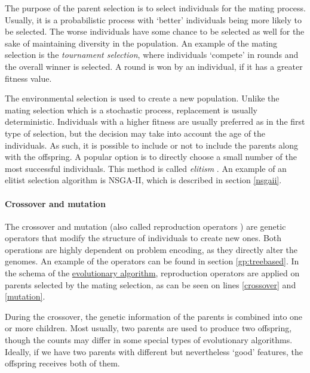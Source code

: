 The purpose of the parent selection is to select individuals for the
mating process. Usually, it is a probabilistic process with `better'
individuals being more likely to be selected. The worse individuals have some
chance to be selected as well for the sake of maintaining diversity in the
population. An example of the mating selection is the
\emph{tournament selection}, where individuals `compete' in rounds and the
overall winner is selected. A round is won by an individual, if it has a 
greater fitness value.

The environmental selection is used to create a new 
population. Unlike the mating selection which is a stochastic process,
replacement is usually deterministic. Individuals with a higher fitness are
usually preferred as in the first type of selection, but the decision may take 
into account the age of the individuals. As such, it is possible to include 
or not to include the parents along with the offspring. A popular option is to 
directly choose a small number of the most successful individuals. This method 
is called \emph{elitism} \citep{Eiben:2015:IEC:2810085}.
An example of an elitist selection algorithm is NSGA-II, which
is described in section \ref{nsgaii}.

\paragraph{Crossover and mutation}
The crossover and mutation (also called reproduction operators
\citep{Engelbrecht:2007:CII:1557464}) are genetic operators that modify the
structure of individuals to create new ones. Both operations are highly
dependent on problem encoding, as they directly alter the genomes. An example
of the operators can be found in section \ref{gp:treebased}. In the schema 
of the \hyperref[alg:EA]{evolutionary algorithm}, reproduction operators
are applied on parents selected by the mating selection, as can be seen on 
lines \ref{crossover} and \ref{mutation}.

During the crossover, the genetic information of the parents is combined into
one or more children. Most usually, two parents are used to produce two
offspring, though the counts may differ in some special types of evolutionary
algorithms. Ideally, if we have two parents with different but nevertheless
`good' features, the offspring receives both of them.
\citep{Eiben:2015:IEC:2810085}

